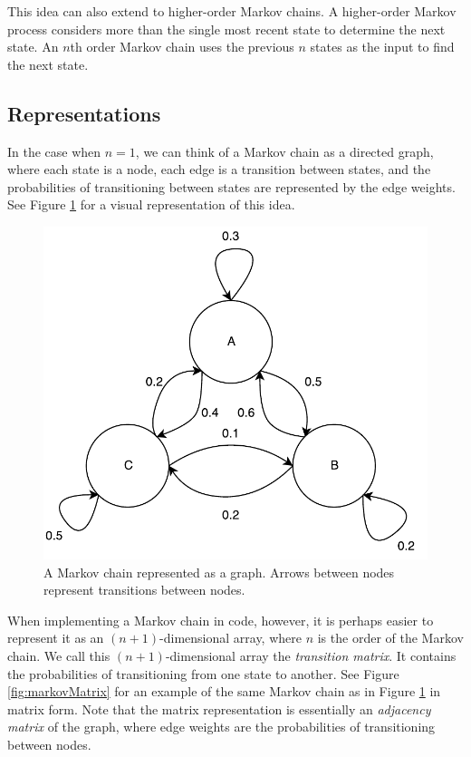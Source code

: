 This idea can also extend to higher-order Markov chains.
A higher-order Markov process considers more than the single most recent state to determine the next state.
An $n$th order Markov chain uses the previous $n$ states as the input to find the next state.

\subsection{Representations} \label{bg:markov:representations}

In the case when $n = 1$, we can think of a Markov chain as a directed graph, where each state is a node, each edge is a transition between states, and the probabilities of transitioning between states are represented by the edge weights.
See Figure \ref{fig:markovGraph} for a visual representation of this idea.

\begin{figure}[h]
	\centering
	\includegraphics[width=\linewidth]{figures/markovGraph.pdf}
	\caption[A Markov chain represented as a graph.]{A Markov chain represented as a graph. Arrows between nodes represent transitions between nodes.}
	\label{fig:markovGraph}
\end{figure}

When implementing a Markov chain in code, however, it is perhaps easier to represent it as an $(n + 1)$-dimensional array, where $n$ is the order of the Markov chain.
We call this $(n + 1)$-dimensional array the \textit{transition matrix}.
It contains the probabilities of transitioning from one state to another.
See Figure \ref{fig:markovMatrix} for an example of the same Markov chain as in Figure \ref{fig:markovGraph} in matrix form.
Note that the matrix representation is essentially an \textit{adjacency matrix} of the graph, where edge weights are the probabilities of transitioning between nodes.

